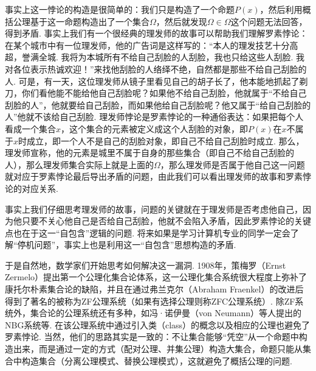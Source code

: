 事实上这一悖论的构造是很简单的：我们只是构造了一个命题$P(x)$，然后利用概括公理基于这一命题构造出了一个集合$\Omega$，然后就发现$\Omega\in\Omega$这个问题无法回答，得到矛盾. 事实上我们有一个很经典的理发师的故事可以帮助我们理解罗素悖论：在某个城市中有一位理发师，他的广告词是这样写的：“本人的理发技艺十分高超，誉满全城. 我将为本城所有不给自己刮脸的人刮脸，我也只给这些人刮脸. 我对各位表示热诚欢迎！”来找他刮脸的人络绎不绝，自然都是那些不给自己刮脸的人. 可是，有一天，这位理发师从镜子里看见自己的胡子长了，他本能地抓起了剃刀，你们看他能不能给他自己刮脸呢？如果他不给自己刮脸，他就属于``不给自己刮脸的人''，他就要给自己刮脸，而如果他给自己刮脸呢？他又属于``给自己刮脸的人''他就不该给自己刮脸. 理发师悖论是罗素悖论的一种通俗表达：如果把每个人看成一个集合$x$，这个集合的元素被定义成这个人刮脸的对象，即$P(x)$在$x$不属于$x$时成立，即一个人不是自己的刮脸对象，即自己不给自己刮脸时成立. 那么，理发师宣称，他的元素是城里不属于自身的那些集合（即自己不给自己刮脸的人），那么理发师集合实际上就是上面的$\Omega$，那么理发师是否属于他自己这一问题就对应于罗素悖论最后导出矛盾的问题，由此我们可以看出理发师的故事和罗素悖论的对应关系.

事实上我们仔细思考理发师的故事，问题的关键就在于理发师是否考虑他自己，因为他只要不关心他自己是否给自己刮脸，他就不会陷入矛盾，因此罗素悖论的关键点也在于这一``自包含''逻辑的问题. 将来如果是学习计算机专业的同学一定会了解``停机问题''，事实上也是利用这一``自包含''思想构造的矛盾.

于是自然地，数学家们开始思考如何解决这一漏洞. 1908年，策梅罗（Ernst Zermelo）提出第一个公理化集合论体系，这一公理化集合系统很大程度上弥补了康托尔朴素集合论的缺陷，并且在通过弗兰克尔（Abraham Fraenkel）的改进后得到了著名的被称为ZF公理系统（如果有选择公理则称ZFC公理系统）. 除ZF系统外，集合论的公理系统还有多种，如冯·诺伊曼（von Neumann）等人提出的NBG系统等. 在该公理系统中通过引入类（class）的概念以及相应的公理也避免了罗素悖论. 当然，他们的思路其实是一致的：不让集合能够``凭空''从一个命题中构造出来，而是通过一定的方式（配对公理、并集公理）构造大集合，命题只能从集合中构造集合（分离公理模式、替换公理模式），这就避免了概括公理的问题.




